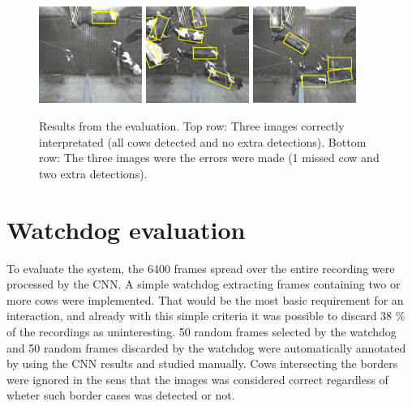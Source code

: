 \documentclass[10pt,a4paper,twocolumn]{article}
\begin{document}
\begin{figure}[tb]
\begin{center}
  \includegraphics[width=0.3\textwidth]{bad/1419743355933936.jpg}
  \includegraphics[width=0.3\textwidth]{bad/1420050868326145.jpg}
  \includegraphics[width=0.3\textwidth]{bad/1420185482574217.jpg}
\end{center}
  \caption{Results from the evaluation. Top row: Three images correctly interpretated (all cows detected and no extra detections). Bottom row: The three images were the errors were made (1 missed cow and two extra detections).}
  \label{fig:res}
\end{figure}

\section{Watchdog evaluation}
To evaluate the system, the 6400 frames spread over the entire recording were processed by the CNN. A simple watchdog extracting frames containing two or more cows were implemented. That would be the most basic requirement for an interaction, and already with this simple criteria it was possible to discard 38 \% of the recordings as uninteresting. 50 random frames selected by the watchdog and 50 random frames discarded by the watchdog were automatically annotated by using the CNN results and studied manually. Cows intersecting the borders were ignored in the sens that the images was considered correct regardless of wheter such border cases was detected or not.
\end{document}
